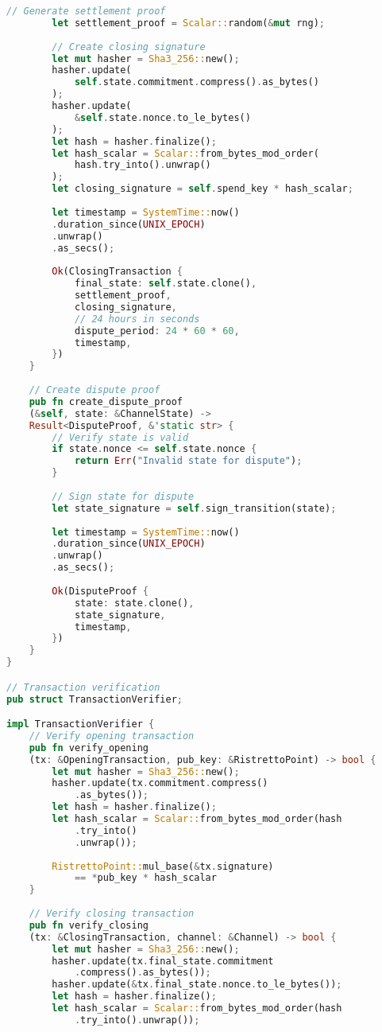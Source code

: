 \documentclass[11pt]{amsart}
\begin{document}
\begin{lstlisting}[language=Rust]
		// Generate settlement proof
		let settlement_proof = Scalar::random(&mut rng);
		
		// Create closing signature
		let mut hasher = Sha3_256::new();
		hasher.update(
			self.state.commitment.compress().as_bytes()
		);
		hasher.update(
			&self.state.nonce.to_le_bytes()
		);
		let hash = hasher.finalize();
		let hash_scalar = Scalar::from_bytes_mod_order(
			hash.try_into().unwrap()
		);
		let closing_signature = self.spend_key * hash_scalar;
		
		let timestamp = SystemTime::now()
		.duration_since(UNIX_EPOCH)
		.unwrap()
		.as_secs();
		
		Ok(ClosingTransaction {
			final_state: self.state.clone(),
			settlement_proof,
			closing_signature,
			// 24 hours in seconds
			dispute_period: 24 * 60 * 60,
			timestamp,
		})
	}
	
	// Create dispute proof
	pub fn create_dispute_proof
	(&self, state: &ChannelState) -> 
	Result<DisputeProof, &'static str> {
		// Verify state is valid
		if state.nonce <= self.state.nonce {
			return Err("Invalid state for dispute");
		}
		
		// Sign state for dispute
		let state_signature = self.sign_transition(state);
		
		let timestamp = SystemTime::now()
		.duration_since(UNIX_EPOCH)
		.unwrap()
		.as_secs();
		
		Ok(DisputeProof {
			state: state.clone(),
			state_signature,
			timestamp,
		})
	}
}

// Transaction verification
pub struct TransactionVerifier;

impl TransactionVerifier {
	// Verify opening transaction
	pub fn verify_opening
	(tx: &OpeningTransaction, pub_key: &RistrettoPoint) -> bool {
		let mut hasher = Sha3_256::new();
		hasher.update(tx.commitment.compress()
			.as_bytes());
		let hash = hasher.finalize();
		let hash_scalar = Scalar::from_bytes_mod_order(hash
			.try_into()
			.unwrap());
		
		RistrettoPoint::mul_base(&tx.signature) 
			== *pub_key * hash_scalar
	}
	
	// Verify closing transaction
	pub fn verify_closing
	(tx: &ClosingTransaction, channel: &Channel) -> bool {
		let mut hasher = Sha3_256::new();
		hasher.update(tx.final_state.commitment
			.compress().as_bytes());
		hasher.update(&tx.final_state.nonce.to_le_bytes());
		let hash = hasher.finalize();
		let hash_scalar = Scalar::from_bytes_mod_order(hash
			.try_into().unwrap());
		

\end{lstlisting}
\end{document}
